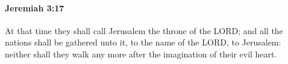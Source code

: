 
		\paragraph{Jeremiah 3:17} %
			\label{JEREMIAH-3-17}

			At that time they shall call Jerusalem the throne of the LORD; and all the nations shall be gathered unto it, to the name of the LORD, to Jerusalem: neither shall they walk any more after the imagination of their evil heart.



